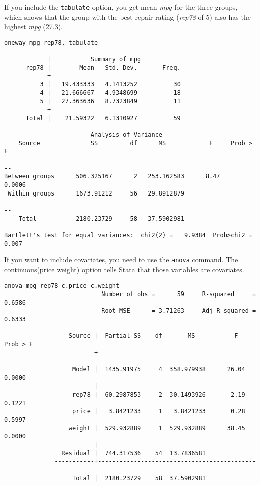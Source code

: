 If you include the \lstinline{tabulate} option, you get mean \textit{mpg} for the three groups, which shows that the group with the best repair rating (\textit{rep78} of 5) also has the highest \textit{mpg} (27.3).

\begin{lstlisting}
oneway mpg rep78, tabulate

            |           Summary of mpg
      rep78 |        Mean   Std. Dev.       Freq.
------------+------------------------------------
          3 |   19.433333   4.1413252          30
          4 |   21.666667   4.9348699          18
          5 |   27.363636   8.7323849          11
------------+------------------------------------
      Total |    21.59322   6.1310927          59

                        Analysis of Variance
    Source              SS         df      MS            F     Prob > F
------------------------------------------------------------------------
Between groups      506.325167      2   253.162583      8.47     0.0006
 Within groups      1673.91212     56   29.8912879
------------------------------------------------------------------------
    Total           2180.23729     58   37.5902981

Bartlett's test for equal variances:  chi2(2) =   9.9384  Prob>chi2 = 0.007
\end{lstlisting}

If you want to include covariates, you need to use the \lstinline{anova} command. The continuous(price weight) option tells Stata that those variables are covariates.

\begin{lstlisting}
anova mpg rep78 c.price c.weight
                           Number of obs =      59     R-squared     =  0.6586
                           Root MSE      = 3.71263     Adj R-squared =  0.6333

                  Source |  Partial SS    df       MS           F     Prob > F
              -----------+----------------------------------------------------
                   Model |  1435.91975     4  358.979938      26.04     0.0000
                         |
                   rep78 |  60.2987853     2  30.1493926       2.19     0.1221
                   price |   3.8421233     1   3.8421233       0.28     0.5997
                  weight |  529.932889     1  529.932889      38.45     0.0000
                         |
                Residual |  744.317536    54  13.7836581
              -----------+----------------------------------------------------
                   Total |  2180.23729    58  37.5902981
\end{lstlisting}

